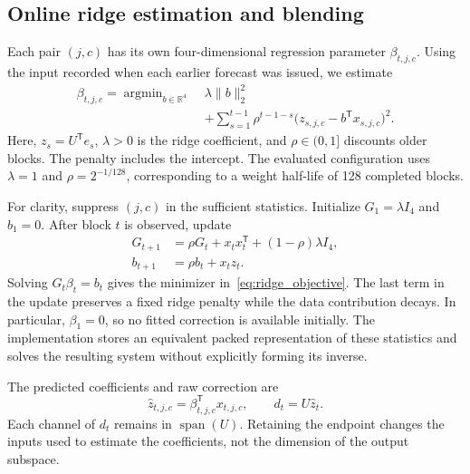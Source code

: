 \subsection{Online ridge estimation and blending}
Each pair $(j,c)$ has its own four-dimensional regression parameter $\beta_{t,j,c}$. Using the input recorded when each earlier forecast was issued, we estimate
\begin{equation}
 \begin{split}
 \beta_{t,j,c}=\mathop{\arg\min}_{b\in\mathbb{R}^4}\; &
 \lambda\lVert b\rVert_2^2\\
 &+\sum_{s=1}^{t-1}\rho^{t-1-s}
 \bigl(z_{s,j,c}-b^{\mathsf T}x_{s,j,c}\bigr)^2.
 \end{split}
 \label{eq:ridge_objective}
\end{equation}
Here, $z_s=U^{\mathsf T}e_s$, $\lambda>0$ is the ridge coefficient, and $\rho\in(0,1]$ discounts older blocks. The penalty includes the intercept. The evaluated configuration uses $\lambda=1$ and $\rho=2^{-1/128}$, corresponding to a weight half-life of 128 completed blocks.

For clarity, suppress $(j,c)$ in the sufficient statistics. Initialize $G_1=\lambda I_4$ and $b_1=0$. After block $t$ is observed, update
\begin{equation}
 \begin{split}
 G_{t+1}&=\rho G_t+x_t x_t^{\mathsf T}+(1-\rho)\lambda I_4,\\
 b_{t+1}&=\rho b_t+x_t z_t.
 \end{split}
 \label{eq:ridge_update}
\end{equation}
Solving $G_t\beta_t=b_t$ gives the minimizer in~\eqref{eq:ridge_objective}. The last term in the update preserves a fixed ridge penalty while the data contribution decays. In particular, $\beta_1=0$, so no fitted correction is available initially. The implementation stores an equivalent packed representation of these statistics and solves the resulting system without explicitly forming its inverse.

The predicted coefficients and raw correction are
\begin{equation}
 \widehat z_{t,j,c}=\beta_{t,j,c}^{\mathsf T}x_{t,j,c},
 \qquad d_t=U\widehat z_t.
 \label{eq:raw_correction}
\end{equation}
Each channel of $d_t$ remains in $\operatorname{span}(U)$. Retaining the endpoint changes the inputs used to estimate the coefficients, not the dimension of the output subspace.

